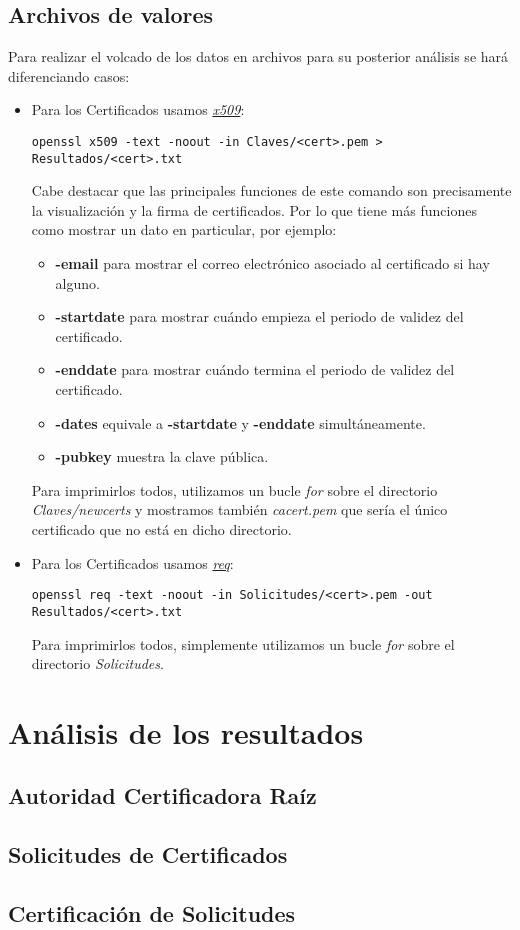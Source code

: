 \documentclass[a4paper, 11pt]{article}
\begin{document}
	\subsection{Archivos de valores}
		Para realizar el volcado de los datos en archivos para su posterior análisis se hará diferenciando casos:
		\begin{itemize}
			\item Para los Certificados usamos \href{https://www.openssl.org/docs/man1.0.2/apps/x509.html}{\textit{x509}}:
			\begin{small}
				\verb|openssl x509 -text -noout -in Claves/<cert>.pem > Resultados/<cert>.txt|\\
			\end{small}
			
			Cabe destacar que las principales funciones de este comando son precisamente la visualización y la firma de
			certificados. Por lo que tiene más funciones como mostrar un dato en particular, por ejemplo:
			\begin{itemize}
				\item \textbf{-email} para mostrar el correo electrónico asociado al certificado si hay alguno.
				\item \textbf{-startdate} para mostrar cuándo empieza el periodo de validez del certificado.
				\item \textbf{-enddate} para mostrar cuándo termina el periodo de validez del certificado.
				\item \textbf{-dates} equivale a \textbf{-startdate} y \textbf{-enddate} simultáneamente.
				\item \textbf{-pubkey} muestra la clave pública.
			\end{itemize}
			
			Para imprimirlos todos, utilizamos un bucle \textit{for} sobre el directorio \textit{Claves/newcerts} y mostramos
			también \textit{cacert.pem} que sería el único certificado que no está en dicho directorio.
			
			\item Para los Certificados usamos \href{https://www.openssl.org/docs/man1.0.2/apps/req.html}{\textit{req}}:
			\begin{small}
				\verb|openssl req -text -noout -in Solicitudes/<cert>.pem -out Resultados/<cert>.txt|\\
			\end{small}
			
			Para imprimirlos todos, simplemente utilizamos un bucle \textit{for} sobre el directorio \textit{Solicitudes}.
		\end{itemize}
		
\section{Análisis de los resultados}
	\subsection{Autoridad Certificadora Raíz}
	\subsection{Solicitudes de Certificados}
	\subsection{Certificación de Solicitudes}
	
\end{document}
